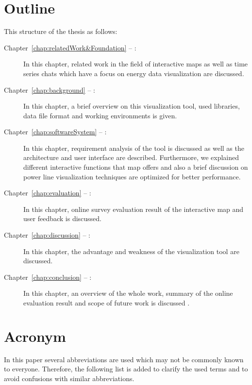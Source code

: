 \section*{Outline}
This structure of the thesis as follows:
\begin{description}

\item[Chapter~\ref{chap:relatedWork&Foundation} -- :]
In this chapter, related work in the field of interactive maps as well as time series chats which have a focus on energy data visualization are discussed. 

\item[Chapter~\ref{chap:background} -- :]
In this chapter, a brief overview on this visualization tool, used libraries, data file format and working environments is given.

\item[Chapter~\ref{chap:softwareSystem} -- :] In this chapter, requirement analysis of the tool is discussed as well as the architecture and user interface are described. Furthermore, we explained different interactive functions that map offers and also a brief discussion on power line visualization techniques are optimized for better performance. 
 
\item[Chapter~\ref{chap:evaluation} -- :] In this chapter, online survey evaluation result of the interactive map and user feedback is discussed.   

\item[Chapter~\ref{chap:discussion} -- :] In this chapter, the advantage and weakness of the visualization tool are discussed.

\item[Chapter~\ref{chap:conclusion} -- :] In this chapter, an overview of the whole work, summary of the online evaluation result and scope of future work is discussed .

\end{description}

\section*{Acronym}
In this paper several abbreviations are used which may not be commonly known to everyone. Therefore, the following list is added to clarify the used terms and to avoid confusions with similar abbreviations. 

